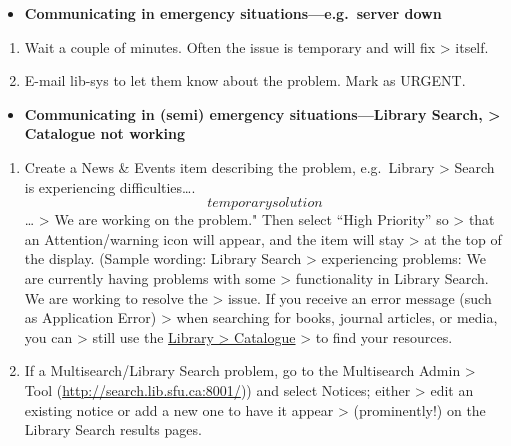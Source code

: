 \documentclass[
  openany]{book}
\providecommand{\tightlist}{%
  \setlength{\itemsep}{0pt}\setlength{\parskip}{0pt}}
\begin{document}
\begin{itemize}
\tightlist
\item
  \textbf{Communicating in emergency situations---e.g.~server down}
\end{itemize}

\begin{enumerate}
\def\labelenumi{\arabic{enumi}.}
\item
  Wait a couple of minutes. Often the issue is temporary and will fix
  \textgreater{} itself.
\item
  E-mail lib-sys to let them know about the problem. Mark as URGENT.
\end{enumerate}

\begin{itemize}
\tightlist
\item
  \textbf{Communicating in (semi) emergency situations---Library Search,
  \textgreater{} Catalogue not working}
\end{itemize}

\begin{enumerate}
\def\labelenumi{\arabic{enumi}.}
\item
  Create a News \& Events item describing the problem, e.g.~Library
  \textgreater{} Search is experiencing difficulties\ldots. \[temporary solution\]\ldots{}
  \textgreater{} We are working on the problem." Then select ``High Priority'' so
  \textgreater{} that an Attention/warning icon will appear, and the item will stay
  \textgreater{} at the top of the display. (Sample wording: Library Search
  \textgreater{} experiencing problems: We are currently having problems with some
  \textgreater{} functionality in Library Search. We are working to resolve the
  \textgreater{} issue. If you receive an error message (such as Application Error)
  \textgreater{} when searching for books, journal articles, or media, you can
  \textgreater{} still use the \href{https://sfu-primo.hosted.exlibrisgroup.com/primo-explore/search?vid=SFUL\&sortby=rank}{{Library
  \textgreater{} Catalogue}}
  \textgreater{} to find your resources.
\item
  If a Multisearch/Library Search problem, go to the Multisearch Admin
  \textgreater{} Tool (\url{http://search.lib.sfu.ca:8001/})) and select Notices; either
  \textgreater{} edit an existing notice or add a new one to have it appear
  \textgreater{} (prominently!) on the Library Search results pages.
\end{enumerate}
\end{document}
